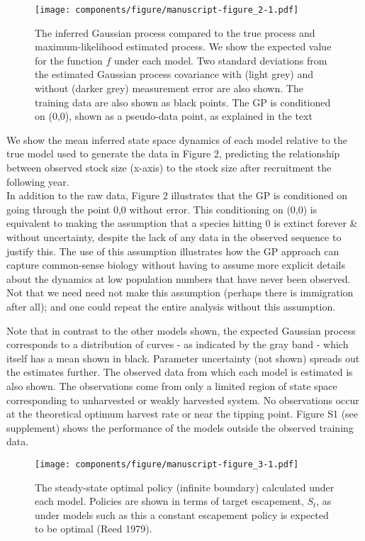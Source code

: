 \documentclass[author-year, 12pt,review]{components/elsarticle} %
\makeatletter
\def\maxwidth{\ifdim\Gin@nat@width>\linewidth\linewidth
\else\Gin@nat@width\fi}
\let\Oldincludegraphics\includegraphics
\renewcommand{\includegraphics}[1]{\Oldincludegraphics[width=\maxwidth]{#1}}
\makeatother
\begin{document}
\begin{figure}[htbp]
\centering
\texttt{[image: components/figure/manuscript-figure\_2-1.pdf]}
\caption{The inferred Gaussian process compared to the true process and
maximum-likelihood estimated process. We show the expected value for the
function $f$ under each model. Two standard deviations from the
estimated Gaussian process covariance with (light grey) and without
(darker grey) measurement error are also shown. The training data are
also shown as black points. The GP is conditioned on (0,0), shown as a
pseudo-data point, as explained in the text}
\end{figure}

We show the mean inferred state space dynamics of each model relative to
the true model used to generate the data in Figure 2, predicting the
relationship between observed stock size (x-axis) to the stock size
after recruitment the following year.\\In addition to the raw data,
Figure 2 illustrates that the GP is conditioned on going through the
point 0,0 without error. This conditioning on (0,0) is equivalent to
making the assumption that a species hitting 0 is extinct forever \&
without uncertainty, despite the lack of any data in the observed
sequence to justify this. The use of this assumption illustrates how the
GP approach can capture common-sense biology without having to assume
more explicit details about the dynamics at low population numbers that
have never been observed. Not that we need need not make this assumption
(perhaps there is immigration after all); and one could repeat the
entire analysis without this assumption.

Note that in contrast to the other models shown, the expected Gaussian
process corresponds to a distribution of curves - as indicated by the
gray band - which itself has a mean shown in black. Parameter
uncertainty (not shown) spreads out the estimates further. The observed
data from which each model is estimated is also shown. The observations
come from only a limited region of state space corresponding to
unharvested or weakly harvested system. No observations occur at the
theoretical optimum harvest rate or near the tipping point. Figure S1
(see supplement) shows the performance of the models outside the
observed training data.

\begin{figure}[htbp]
\centering
\texttt{[image: components/figure/manuscript-figure\_3-1.pdf]}
\caption{The steady-state optimal policy (infinite boundary) calculated
under each model. Policies are shown in terms of target escapement,
$S_t$, as under models such as this a constant escapement policy is
expected to be optimal (Reed 1979).}
\end{figure}
\end{document}
